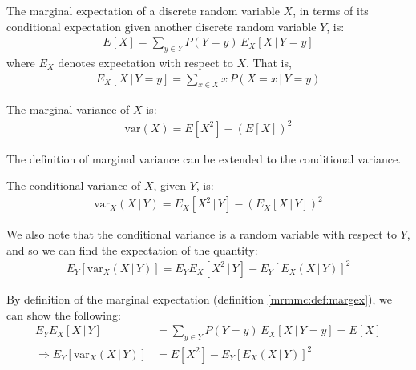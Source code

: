 \documentclass[12pt, twoside, a4paper]{report}
\def\var{\text{var}}
\begin{document}
\begin{mydef}
\label{mrmmc:def:margex}
The marginal expectation of a discrete random variable $X$, in terms of its conditional expectation given another discrete random variable $Y$, is:
\begin{align*}
E[X] = \sum_{y \in Y} P(Y=y) \, E_X[X \, | \, Y=y]
\end{align*}
where $E_X$ denotes expectation with respect to $X$. That is,
\begin{align*}
E_X[X \, | \,Y=y] = \sum_{x\in X} x \, P(X=x \, | \, Y=y)
\end{align*}
\end{mydef}

\begin{mydef}
\label{mrmmc:def:margvar}
The marginal variance of $X$ is:
\begin{align*}
\var(X) = E[X^2] - \left( E[X] \right) ^2
\end{align*}
\end{mydef}

The definition of marginal variance can be extended to the conditional variance.\\

\begin{mydef}
The conditional variance of $X$, given $Y$, is:
\begin{align*}
\var_X(X \, | \, Y) = E_X[X^2 \, | \, Y] - \left( E_X[X \, | \, Y] \right)^2
\end{align*}
\end{mydef}

We also note that the conditional variance is a random variable with respect to $Y$, and so we can find the expectation of the quantity:
\begin{align*}
E_Y [ \var_X(X \, | \, Y) ] = E_YE_X[X^2 \, | \, Y] - E_Y [ E_X(X\,|\,Y) ] ^2
\end{align*}

By definition of the marginal expectation (definition \ref{mrmmc:def:margex}), we can show the following:
\begin{align}
E_YE_X[X \, | \, Y] &= \sum_{y \in Y} P(Y=y) \, E_X[X \, | \, Y=y] = E[X] \label{mrmmc:eq:exp1} \\
\Rightarrow E_Y [ \var_X(X \, | \, Y) ] &= E[X^2] - E_Y [ E_X(X\,|\,Y) ] ^2 \label{mrmmc:eq:exp2}
\end{align}
\end{document}
